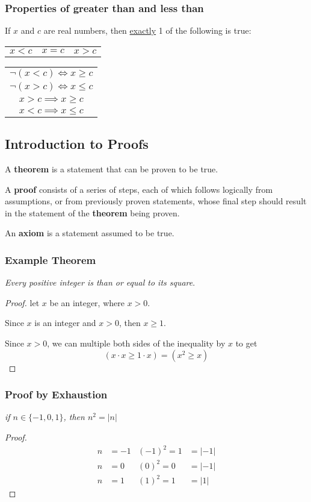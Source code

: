 \subsubsection*{Properties of greater than  and less than}

If $x$ and $c$ are real numbers, then \underline{exactly} 1 of the following is true:
\begin{center}
  \begin{tabular}{ccc}
    $x<c$ & $x=c$ & $x>c$
  \end{tabular}
  \begin{tabular}{c}
    $\lnot (x < c) \Leftrightarrow x \geq c$ \\
    $\lnot (x > c) \Leftrightarrow x \leq c$ \\
    \hline
    $x > c \implies x \geq c$                \\
    $x < c \implies x \leq c$
  \end{tabular}
\end{center}

\subsection{Introduction to Proofs}
A \textbf{theorem} is a statement that can be proven to be true.

A \textbf{proof} consists of a series of steps, each of which follows
logically from assumptions, or from previously proven statements,
whose final step should result in the statement of the \textbf{theorem} being proven.

An \textbf{axiom} is a statement assumed to be true.
\subsubsection*{Example Theorem}
\textit{Every positive integer is than or equal to its square}.
\begin{proof}
  let $x$ be an integer, where $x>0$.

  Since $x$ is an integer and $x>0$, then $x \geq 1$.

  Since $x > 0$, we can multiple both sides of the inequality by $x$ to get
  \[
    (x \cdot x \geq 1 \cdot x) = (x^2 \geq x)
  \]
\end{proof}
\subsubsection*{Proof by Exhaustion}
\textit{if $n \in \{-1,0,1\}$, then $n^2 = \left\lvert n\right\rvert $}
\begin{proof}
  \begin{align*}
    n & = -1 & (-1)^2 = 1 & = \left\lvert -1\right\rvert \\
    n & = 0  & (0)^2 = 0  & = \left\lvert -1\right\rvert \\
    n & = 1  & (1)^2 = 1  & = \left\lvert 1\right\rvert
  \end{align*}
\end{proof}

